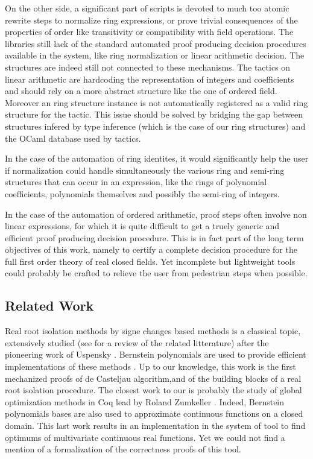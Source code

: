 \documentclass{mscs}
\begin{document}
On the other side, a significant part of scripts is devoted to much
too atomic rewrite steps to normalize ring expressions, or prove trivial
consequences of the properties of order like transitivity or
compatibility with field operations. The \ssr{} libraries still
lack of the standard
automated proof producing decision procedures available in the \Coq{}
system, like ring normalization or linear arithmetic decision. The
\ssr{} structures are indeed still not connected to these
mechanisms. The \Coq{} tactics on linear arithmetic are hardcoding the
representation of integers and coefficients and should rely on a more
abstract structure like the one of ordered field. Moreover an \ssr{}
ring structure instance is not automatically registered as a
valid ring structure for the  tactic. This issue should be
solved by bridging the gap between structures infered by type inference
(which is the case of our ring structures) and the OCaml database used
by \Coq{} tactics.

In the case of the automation of ring identites, it would significantly
help the user if normalization could handle simultaneously the various
ring and semi-ring structures that can occur in an expression, like
the rings of polynomial coefficients, polynomials themselves and
possibly the semi-ring of integers.

In the case of the automation of ordered arithmetic, proof steps
often involve non linear expressions, for which it is quite difficult
to get a truely generic and efficient proof producing decision
procedure. This is in fact part of the long term objectives of this
work, namely to
certify a complete decision procedure for the full first order theory
of real closed fields. Yet incomplete but lightweight tools could
probably be crafted to relieve the user from pedestrian steps when
possible.

\subsection{Related Work}
Real root isolation methods by signe changes based methods is a
classical topic, extensively studied (see \cite{rouillieretal} for a
review of the related litterature) after the pioneering work of
Uspensky \cite{uspensky}. Bernstein polynomials are used to provide
efficient implementations of these methods
\cite{mourrainetal, rouillieretal}. Up to our knowledge, this work is
the first mechanized proofs of de Casteljau algorithm,and of the
building blocks of a real root isolation procedure. The closest work
to our is probably the study of global optimization methods in Coq
lead by Roland Zumkeller \cite{zumkellerphd}. Indeed, Bernstein
polynomials bases are also used to approximate continuous functions on a
closed domain. This last work results in an implementation in the
\Coq{} system of tool to find optimums of multivariate continuous real
functions. Yet we could not find a mention of a formalization of the
correctness proofs of this tool.
\end{document}
